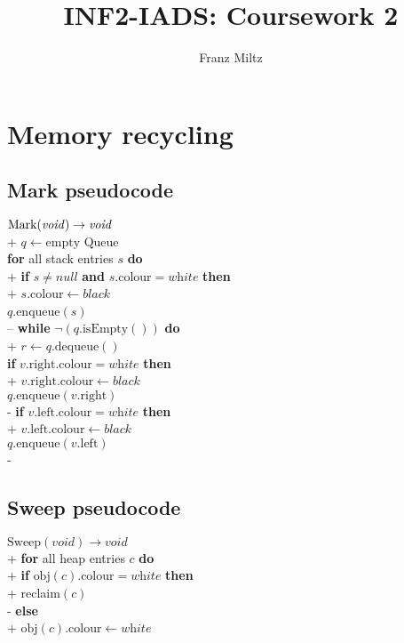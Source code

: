 \documentclass{article}
\title{INF2-IADS: Coursework 2}
\author{Franz Miltz}
\begin{document}
\maketitle


\section{Memory recycling}

\subsection{Mark pseudocode}

\begin{pseudo}
$\text{Mark}(\text{\emph{void}}) \to \text{\emph{void}}$\\+
    $q\leftarrow \text{empty Queue}$\\
    \textbf{for} all stack entries $s$ \textbf{do}\\+
        \textbf{if} $s\not=\textit{null}$ \textbf{and} $s.\text{colour} = \textit{white}$ \textbf{then}\\+
            $s.\text{colour} \leftarrow \textit{black}$\\
            $q$.enqueue$(s)$\\--
    \textbf{while} $\neg(q.\text{isEmpty}())$ \textbf{do}\\+
        $r\leftarrow q.\text{dequeue}()$\\
        \textbf{if} $v.\text{right}.\text{colour} = \textit{white}$ \textbf{then}\\+
            $v.\text{right}.\text{colour}\leftarrow\textit{black}$\\
            $q.\text{enqueue}(v.\text{right})$\\-
        \textbf{if} $v.\text{left}.\text{colour} = \textit{white}$ \textbf{then}\\+
            $v.\text{left}.\text{colour}\leftarrow\textit{black}$\\
            $q.\text{enqueue}(v.\text{left})$\\-
\end{pseudo}

\subsection{Sweep pseudocode}

\begin{pseudo}
$\text{Sweep}(\textit{void})\to\textit{void}$\\+
    \textbf{for} all heap entries $c$ \textbf{do}\\+
        \textbf{if} $\text{obj}(c).\text{colour} = \textit{white}$ \textbf{then}\\+
            reclaim$(c)$\\-
        \textbf{else}\\+
            $\text{obj}(c).\text{colour}\leftarrow\textit{white}$
\end{pseudo}
\end{document}
